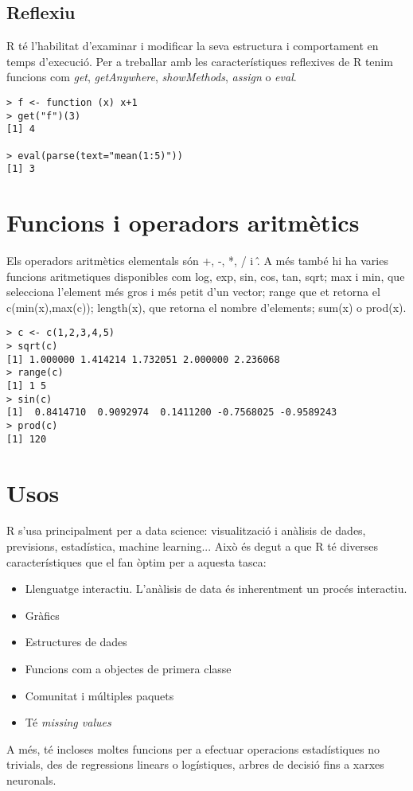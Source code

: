 \documentclass[12pt]{article}
\begin{document}
\subsection{Reflexiu}
R té l'habilitat d'examinar i modificar la seva estructura i comportament en temps d'execució.
Per a treballar amb les característiques reflexives de R tenim funcions com \textit{get}, \textit{getAnywhere}, \textit{showMethods}, \textit{assign} o \textit{eval}.
 
\begin{verbatim}
> f <- function (x) x+1
> get("f")(3)
[1] 4

> eval(parse(text="mean(1:5)"))
[1] 3

\end{verbatim}



\section{Funcions i operadors aritmètics}
Els operadors aritmètics elementals són +, -, *, / i \^. A més també hi ha varies funcions aritmetiques disponibles com log, exp, sin, cos, tan, sqrt; max i min, que selecciona l'element més gros i més petit d'un vector; range que et retorna el c(min(x),max(c)); length(x), que retorna el nombre d'elements; sum(x) o prod(x). 

\begin{verbatim}
> c <- c(1,2,3,4,5)
> sqrt(c)
[1] 1.000000 1.414214 1.732051 2.000000 2.236068
> range(c)
[1] 1 5
> sin(c)
[1]  0.8414710  0.9092974  0.1411200 -0.7568025 -0.9589243
> prod(c)
[1] 120
\end{verbatim}


\section{Usos}
R s'usa principalment per a data science: visualització i anàlisis de dades, previsions, estadística, machine learning... Això és degut a que R té diverses característiques que el fan òptim per a aquesta tasca: 
\begin{itemize}
\item Llenguatge interactiu. 
L'anàlisis de data és inherentment un procés interactiu.
\item Gràfics
\item Estructures de dades

\item Funcions com a objectes de primera classe
\item Comunitat i múltiples paquets 
\item Té \textit{missing values}


\end{itemize}
A més, té incloses moltes funcions per a efectuar operacions estadístiques no trivials, des de regressions linears o logístiques, arbres de decisió fins a xarxes neuronals. 
\end{document}
